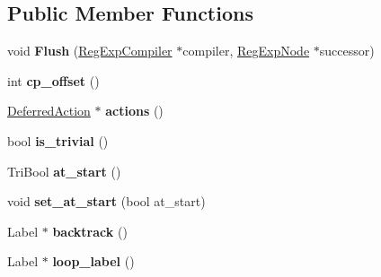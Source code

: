 \subsection*{Public Member Functions}
\begin{DoxyCompactItemize}
\item 
\hypertarget{classv8_1_1internal_1_1_trace_a1bd6080f97b33251cd6e8c3ad8f5ead3}{}void {\bfseries Flush} (\hyperlink{classv8_1_1internal_1_1_reg_exp_compiler}{Reg\+Exp\+Compiler} $\ast$compiler, \hyperlink{classv8_1_1internal_1_1_reg_exp_node}{Reg\+Exp\+Node} $\ast$successor)\label{classv8_1_1internal_1_1_trace_a1bd6080f97b33251cd6e8c3ad8f5ead3}

\item 
\hypertarget{classv8_1_1internal_1_1_trace_a9cb9dd697dda62f3db7e9ec3ecd823df}{}int {\bfseries cp\+\_\+offset} ()\label{classv8_1_1internal_1_1_trace_a9cb9dd697dda62f3db7e9ec3ecd823df}

\item 
\hypertarget{classv8_1_1internal_1_1_trace_a7c53de86842d2c338b9302386d5cbacd}{}\hyperlink{classv8_1_1internal_1_1_trace_1_1_deferred_action}{Deferred\+Action} $\ast$ {\bfseries actions} ()\label{classv8_1_1internal_1_1_trace_a7c53de86842d2c338b9302386d5cbacd}

\item 
\hypertarget{classv8_1_1internal_1_1_trace_a6f3ce5f13fa43ca8e437a872deca5d40}{}bool {\bfseries is\+\_\+trivial} ()\label{classv8_1_1internal_1_1_trace_a6f3ce5f13fa43ca8e437a872deca5d40}

\item 
\hypertarget{classv8_1_1internal_1_1_trace_a5f204f16aa287881fd2f0f310094a647}{}Tri\+Bool {\bfseries at\+\_\+start} ()\label{classv8_1_1internal_1_1_trace_a5f204f16aa287881fd2f0f310094a647}

\item 
\hypertarget{classv8_1_1internal_1_1_trace_a9e2c8e8f0e0d3355ebfbfcf3d7198061}{}void {\bfseries set\+\_\+at\+\_\+start} (bool at\+\_\+start)\label{classv8_1_1internal_1_1_trace_a9e2c8e8f0e0d3355ebfbfcf3d7198061}

\item 
\hypertarget{classv8_1_1internal_1_1_trace_ab4b78fba6c18060801cff3302ad759f2}{}Label $\ast$ {\bfseries backtrack} ()\label{classv8_1_1internal_1_1_trace_ab4b78fba6c18060801cff3302ad759f2}

\item 
\hypertarget{classv8_1_1internal_1_1_trace_a63ab79cbd87d9713d91e895eb564d986}{}Label $\ast$ {\bfseries loop\+\_\+label} ()\label{classv8_1_1internal_1_1_trace_a63ab79cbd87d9713d91e895eb564d986}


\end{DoxyCompactItemize}
